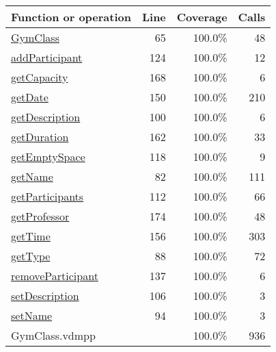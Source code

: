 \bigskip
\begin{longtable}{|l|r|r|r|}
\hline
Function or operation & Line & Coverage & Calls \\
\hline
\hline
\hyperref[GymClass:65]{GymClass} & 65&100.0\% & 48 \\
\hline
\hyperref[addParticipant:124]{addParticipant} & 124&100.0\% & 12 \\
\hline
\hyperref[getCapacity:168]{getCapacity} & 168&100.0\% & 6 \\
\hline
\hyperref[getDate:150]{getDate} & 150&100.0\% & 210 \\
\hline
\hyperref[getDescription:100]{getDescription} & 100&100.0\% & 6 \\
\hline
\hyperref[getDuration:162]{getDuration} & 162&100.0\% & 33 \\
\hline
\hyperref[getEmptySpace:118]{getEmptySpace} & 118&100.0\% & 9 \\
\hline
\hyperref[getName:82]{getName} & 82&100.0\% & 111 \\
\hline
\hyperref[getParticipants:112]{getParticipants} & 112&100.0\% & 66 \\
\hline
\hyperref[getProfessor:174]{getProfessor} & 174&100.0\% & 48 \\
\hline
\hyperref[getTime:156]{getTime} & 156&100.0\% & 303 \\
\hline
\hyperref[getType:88]{getType} & 88&100.0\% & 72 \\
\hline
\hyperref[removeParticipant:137]{removeParticipant} & 137&100.0\% & 6 \\
\hline
\hyperref[setDescription:106]{setDescription} & 106&100.0\% & 3 \\
\hline
\hyperref[setName:94]{setName} & 94&100.0\% & 3 \\
\hline
\hline
GymClass.vdmpp & & 100.0\% & 936 \\
\hline
\end{longtable}

